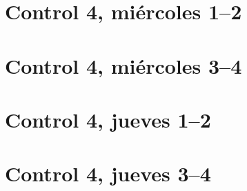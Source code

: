 \documentclass[12pt,spanish,a5paper,landscape]{article}
\begin{document}
  \pagestyle{empty}
  \thispagestyle{empty}

  \part*{Control 4, miércoles 1--2}
  \newpage

  \newpage

  \part*{Control 4, miércoles 3--4}
  \newpage

  \newpage

  \part*{Control 4, jueves 1--2}
  \newpage

  \newpage

  \part*{Control 4, jueves 3--4}
  \newpage
\end{document}
